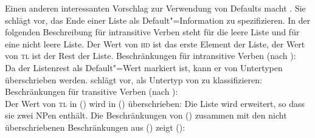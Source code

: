 Einen anderen interessanten Vorschlag zur Verwendung von Defaults macht \citet[--87]{Villavicencio2000a-u}.
Sie schlägt vor, das Ende einer Liste als Default"=Information zu spezifizieren. In der folgenden Beschreibung
für intransitive Verben steht  für die leere Liste und
 für eine nicht leere Liste. 
Der Wert von \textsc{hd} ist das erste Element der Liste, der Wert von \textsc{tl} ist der Rest der Liste.
\eas
Beschränkungen für intransitive Verben (nach \citealt{Villavicencio2000a-u}):\\
  \impl
{}
\zs
Da der Listenrest als Default"=Wert markiert ist, kann er von Untertypen überschrieben werden.
\citet[--87]{Villavicencio2000a-u} schlägt vor,  als Untertyp
von  zu klassifizieren:
\eas
Beschränkungen für transitive Verben (nach \citealt{Villavicencio2000a-u}):\\
 \impl 
{}
\zs
Der Wert von \textsc{tl} in () wird in () überschrieben: Die Liste wird erweitert,
so dass sie zwei NPen enthält. Die Beschränkungen von () zusammen mit den nicht
überschriebenen Beschränkungen aus () zeigt ():
\ea
{}
\z



